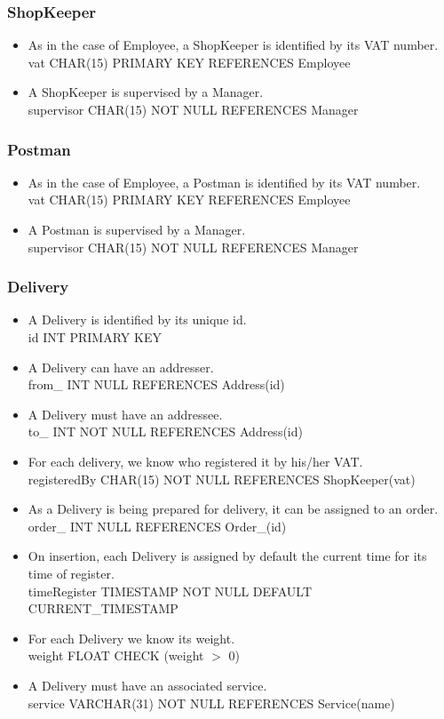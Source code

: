 \documentclass{report}[a4paper]
\theoremstyle{remark}
\begin{document}
\subsubsection{ShopKeeper}
\begin{itemize}
    \item As in the case of Employee, a ShopKeeper is identified by its VAT number. \\ vat CHAR(15) PRIMARY KEY REFERENCES Employee
    \item A ShopKeeper is supervised by a Manager. \\ supervisor CHAR(15) NOT NULL REFERENCES Manager
\end{itemize}
\subsubsection{Postman}
\begin{itemize}
    \item As in the case of Employee, a Postman is identified by its VAT number. \\ vat CHAR(15) PRIMARY KEY REFERENCES Employee
    \item A Postman is supervised by a Manager. \\ supervisor CHAR(15) NOT NULL REFERENCES Manager
\end{itemize}
\subsubsection{Delivery}
\begin{itemize}
    \item A Delivery is identified by its unique id. \\id INT PRIMARY KEY
    \item A Delivery can have an addresser. \\ from\_ INT NULL REFERENCES Address(id)
    \item A Delivery must have an addressee. \\ to\_ INT NOT NULL REFERENCES Address(id)
    \item For each delivery, we know who registered it by his/her VAT. \\ registeredBy CHAR(15) NOT NULL REFERENCES ShopKeeper(vat)
    \item As a Delivery is being prepared for delivery, it can be assigned to an order. \\ order\_ INT NULL REFERENCES Order\_(id)
    \item On insertion, each Delivery is assigned by default the current time for its time of register. \\ timeRegister TIMESTAMP NOT NULL DEFAULT CURRENT\_TIMESTAMP
    \item For each Delivery we know its weight. \\ weight FLOAT CHECK (weight $>$ 0)
    \item A Delivery must have an associated service. \\ service VARCHAR(31) NOT NULL REFERENCES Service(name)
\end{itemize}
\end{document}
